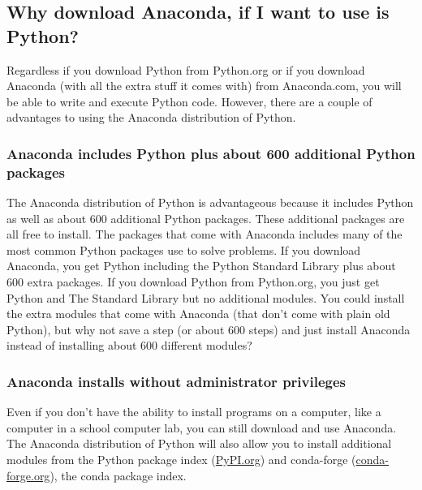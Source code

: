 \documentclass{book}
\begin{document}
    
        \hypertarget{why-download-anaconda-if-i-want-to-use-is-python}{%
\subsection{Why download Anaconda, if I want to use is
Python?}\label{why-download-anaconda-if-i-want-to-use-is-python}}

Regardless if you download Python from Python.org or if you download
Anaconda (with all the extra stuff it comes with) from Anaconda.com, you
will be able to write and execute Python code. However, there are a
couple of advantages to using the Anaconda distribution of Python.

\hypertarget{anaconda-includes-python-plus-about-600-additional-python-packages}{%
\subsubsection{Anaconda includes Python plus about 600 additional Python
packages}\label{anaconda-includes-python-plus-about-600-additional-python-packages}}

The Anaconda distribution of Python is advantageous because it includes
Python as well as about 600 additional Python packages. These additional
packages are all free to install. The packages that come with Anaconda
includes many of the most common Python packages use to solve problems.
If you download Anaconda, you get Python including the Python Standard
Library plus about 600 extra packages. If you download Python from
Python.org, you just get Python and The Standard Library but no
additional modules. You could install the extra modules that come with
Anaconda (that don't come with plain old Python), but why not save a
step (or about 600 steps) and just install Anaconda instead of
installing about 600 different modules?

\hypertarget{anaconda-installs-without-administrator-privileges}{%
\subsubsection{Anaconda installs without administrator
privileges}\label{anaconda-installs-without-administrator-privileges}}

Even if you don't have the ability to install programs on a computer,
like a computer in a school computer lab, you can still download and use
Anaconda. The Anaconda distribution of Python will also allow you to
install additional modules from the Python package index
(\href{https://pypi.org/}{PyPI.org}) and conda-forge
(\href{https://conda-forge.org/}{conda-forge.org}), the conda package
index.
\end{document}
